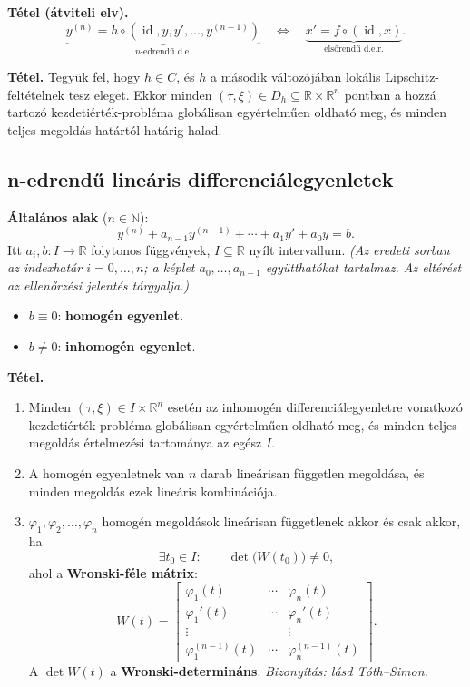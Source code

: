 \begin{matbox}
\textbf{Tétel (átviteli elv).}
\[
 \underbrace{y^{(n)}=h\circ(\operatorname{id},y,y',\ldots,
                         y^{(n-1)})}_{n\text{-edrendű d.e.}}
 \quad\Longleftrightarrow\quad
 \underbrace{x'=f\circ(\operatorname{id},x)}_{\text{elsőrendű d.e.r.}}.
\]
\end{matbox}

\begin{matbox}
\textbf{Tétel.} Tegyük fel, hogy $h\in C$, és $h$ a második
változójában lokális Lipschitz-feltételnek tesz eleget.
Ekkor minden $(\tau,\xi)\in D_h\subseteq\mathbb R\times\mathbb R^n$
pontban a hozzá tartozó kezdetiérték-probléma globálisan
egyértelműen oldható meg, és minden teljes megoldás
határtól határig halad.
\end{matbox}

\subsection{n-edrendű lineáris differenciálegyenletek}
\textbf{Általános alak} ($n\in\mathbb N$):
\[
 y^{(n)}+a_{n-1}y^{(n-1)}+\cdots+a_1y'+a_0y=b.
\]
Itt $a_i,b:I\to\mathbb R$ folytonos függvények,
$I\subseteq\mathbb R$ nyílt intervallum.
\textit{(Az eredeti sorban az indexhatár $i=0,\ldots,n$;
a képlet $a_0,\ldots,a_{n-1}$ együtthatókat tartalmaz.
Az eltérést az ellenőrzési jelentés tárgyalja.)}

\begin{itemize}
\item $b\equiv0$: \textbf{homogén egyenlet}.
\item $b\ne0$: \textbf{inhomogén egyenlet}.
\end{itemize}

\begin{matbox}
\textbf{Tétel.}
\begin{enumerate}[label=\arabic*)]
\item Minden $(\tau,\xi)\in I\times\mathbb R^n$ esetén
az inhomogén differenciálegyenletre vonatkozó kezdetiérték-probléma
globálisan egyértelműen oldható meg, és minden teljes megoldás
értelmezési tartománya az egész $I$.
\item A homogén egyenletnek van $n$ darab lineárisan független megoldása,
és minden megoldás ezek lineáris kombinációja.
\item $\varphi_1,\varphi_2,\ldots,\varphi_n$ homogén megoldások
lineárisan függetlenek akkor és csak akkor, ha
\[
 \exists t_0\in I:\qquad\det\bigl(W(t_0)\bigr)\ne0,
\]
ahol a \textbf{Wronski-féle mátrix}:
\[
 W(t)=\begin{bmatrix}
 \varphi_1(t)&\cdots&\varphi_n(t)\\
 \varphi_1'(t)&\cdots&\varphi_n'(t)\\
 \vdots&&\vdots\\
 \varphi_1^{(n-1)}(t)&\cdots&\varphi_n^{(n-1)}(t)
 \end{bmatrix}.
\]
A $\det W(t)$ a \textbf{Wronski-determináns}.
\textit{Bizonyítás: lásd Tóth--Simon.}
\end{enumerate}
\end{matbox}

